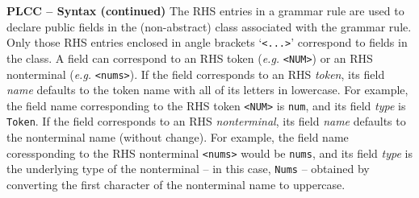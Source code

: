 \begin{minipage}[t]{\sw}
\slidenumber
\LARGE
{\bf PLCC -- Syntax (continued)}\exx
The RHS entries in a grammar rule are used
to declare public fields in the (non-abstract) class
associated with the grammar rule.
Only those RHS entries enclosed in angle brackets `\verb'<...>''
correspond to fields in the class.\exx
A field can correspond to an RHS token ({\em e.g.} \verb'<NUM>')
or an RHS nonterminal ({\em e.g.} \verb'<nums>').\exx
If the field corresponds to an RHS {\em token},
its field {\em name} defaults to the token name
with all of its letters in lowercase.
For example, the field name corresponding
to the RHS token \verb'<NUM>' is \verb'num',
and its field {\em type} is \verb'Token'.
If the field corresponds to an RHS {\em nonterminal},
its field {\em name} defaults to the nonterminal name (without change).
For example, the field name coressponding
to the RHS nonterminal \verb'<nums>' would be \verb'nums',
and its field {\em type} is the underlying type of the nonterminal --
in this case, \verb'Nums' --
obtained by converting the first character
of the nonterminal name to uppercase.\exx
\end{minipage}
\clearpage
